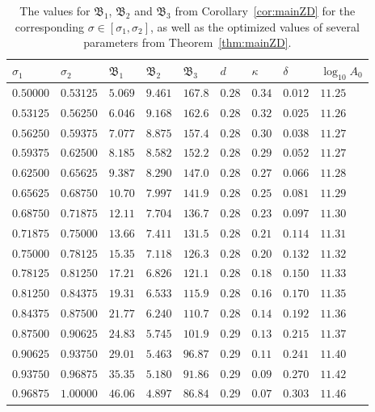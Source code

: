 \documentclass[a4paper,reqno]{amsart}
\theoremstyle{definition}
\begin{document}
\begin{table}[h]
\centering
\footnotesize{
\begin{tabular}{lllllllll} 
\toprule
$\sigma_1$ & $\sigma_2$ & $\mathfrak{B}_1$ & $\mathfrak{B}_2$ & $\mathfrak{B}_3$ & $d$ & $\kappa$ & $\delta$ & $\log_{10}A_0$ \\ 
\midrule
$0.50000$ & $0.53125$ & $5.069$ & $9.461$ & $167.8$ & $0.28$ & $0.34$ & $0.012$ & $11.25$ \\
$0.53125$ & $0.56250$ & $6.046$ & $9.168$ & $162.6$ & $0.28$ & $0.32$ & $0.025$ & $11.26$ \\
$0.56250$ & $0.59375$ & $7.077$ & $8.875$ & $157.4$ & $0.28$ & $0.30$ & $0.038$ & $11.27$ \\
$0.59375$ & $0.62500$ & $8.185$ & $8.582$ & $152.2$ & $0.28$ & $0.29$ & $0.052$ & $11.27$ \\
$0.62500$ & $0.65625$ & $9.387$ & $8.290$ & $147.0$ & $0.28$ & $0.27$ & $0.066$ & $11.28$ \\
$0.65625$ & $0.68750$ & $10.70$ & $7.997$ & $141.9$ & $0.28$ & $0.25$ & $0.081$ & $11.29$ \\
$0.68750$ & $0.71875$ & $12.11$ & $7.704$ & $136.7$ & $0.28$ & $0.23$ & $0.097$ & $11.30$ \\
$0.71875$ & $0.75000$ & $13.66$ & $7.411$ & $131.5$ & $0.28$ & $0.21$ & $0.114$ & $11.31$ \\
$0.75000$ & $0.78125$ & $15.35$ & $7.118$ & $126.3$ & $0.28$ & $0.20$ & $0.132$ & $11.32$ \\
$0.78125$ & $0.81250$ & $17.21$ & $6.826$ & $121.1$ & $0.28$ & $0.18$ & $0.150$ & $11.33$ \\
$0.81250$ & $0.84375$ & $19.31$ & $6.533$ & $115.9$ & $0.28$ & $0.16$ & $0.170$ & $11.35$ \\
$0.84375$ & $0.87500$ & $21.77$ & $6.240$ & $110.7$ & $0.28$ & $0.14$ & $0.192$ & $11.36$ \\
$0.87500$ & $0.90625$ & $24.83$ & $5.745$ & $101.9$ & $0.29$ & $0.13$ & $0.215$ & $11.37$ \\
$0.90625$ & $0.93750$ & $29.01$ & $5.463$ & $96.87$ & $0.29$ & $0.11$ & $0.241$ & $11.40$ \\
$0.93750$ & $0.96875$ & $35.35$ & $5.180$ & $91.86$ & $0.29$ & $0.09$ & $0.270$ & $11.42$ \\
$0.96875$ & $1.00000$ & $46.06$ & $4.897$ & $86.84$ & $0.29$ & $0.07$ & $0.303$ & $11.46$ \\
\bottomrule
\end{tabular}}
\caption{The values for $\mathfrak{B}_1$, $\mathfrak{B}_2$ and $\mathfrak{B}_3$ from Corollary~\ref{cor:mainZD} for the corresponding $\sigma\in[\sigma_1,\sigma_2]$, as well as the optimized values of several parameters from Theorem~\ref{thm:mainZD}.} 
\label{tab:CorMainZD}
\end{table}
\end{document}
